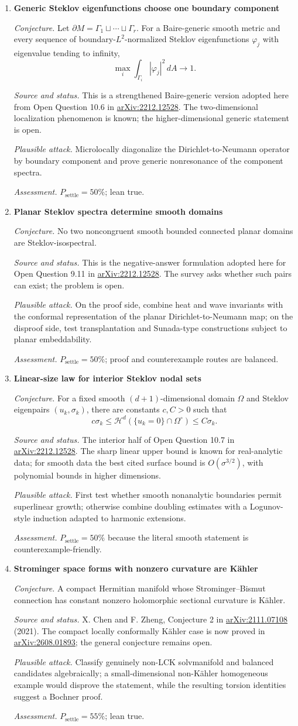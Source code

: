 \documentclass[11pt]{article}
\newcommand{\cand}[5]{%
  \item \textbf{#1}\par
  \emph{Conjecture.} #2\par
  \emph{Source and status.} #3\par
  \emph{Plausible attack.} #4\par
  \emph{Assessment.} #5
}
\newcommand{\psettle}{P_{\mathrm{settle}}}
\begin{document}
\begin{enumerate}[label=\textbf{M\arabic*.}]
\cand{Generic Steklov eigenfunctions choose one boundary component}
{Let $\partial M=\Gamma_1\sqcup\cdots\sqcup\Gamma_r$.  For a Baire-generic smooth metric and every sequence of boundary-$L^2$-normalized Steklov eigenfunctions $\varphi_j$ with eigenvalue tending to infinity,
\[\max_i\int_{\Gamma_i}|\varphi_j|^2\,dA\longrightarrow1.\]}
{This is a strengthened Baire-generic version adopted here from Open Question 10.6 in \href{https://arxiv.org/abs/2212.12528}{arXiv:2212.12528}.  The two-dimensional localization phenomenon is known; the higher-dimensional generic statement is open.}
{Microlocally diagonalize the Dirichlet-to-Neumann operator by boundary component and prove generic nonresonance of the component spectra.}
{$\psettle=50\%$; lean true.}

\cand{Planar Steklov spectra determine smooth domains}
{No two noncongruent smooth bounded connected planar domains are Steklov-isospectral.}
{This is the negative-answer formulation adopted here for Open Question 9.11 in \href{https://arxiv.org/abs/2212.12528}{arXiv:2212.12528}.  The survey asks whether such pairs can exist; the problem is open.}
{On the proof side, combine heat and wave invariants with the conformal representation of the planar Dirichlet-to-Neumann map; on the disproof side, test transplantation and Sunada-type constructions subject to planar embeddability.}
{$\psettle=50\%$; proof and counterexample routes are balanced.}

\cand{Linear-size law for interior Steklov nodal sets}
{For a fixed smooth $(d+1)$-dimensional domain $\Omega$ and Steklov eigenpairs $(u_k,\sigma_k)$, there are constants $c,C>0$ such that
\[c\sigma_k\le\mathcal H^d(\{u_k=0\}\cap\Omega^\circ)\le C\sigma_k.\]}
{The interior half of Open Question 10.7 in \href{https://arxiv.org/abs/2212.12528}{arXiv:2212.12528}.  The sharp linear upper bound is known for real-analytic data; for smooth data the best cited surface bound is $O(\sigma^{3/2})$, with polynomial bounds in higher dimensions.}
{First test whether smooth nonanalytic boundaries permit superlinear growth; otherwise combine doubling estimates with a Logunov-style induction adapted to harmonic extensions.}
{$\psettle=50\%$ because the literal smooth statement is counterexample-friendly.}

\cand{Strominger space forms with nonzero curvature are K\"ahler}
{A compact Hermitian manifold whose Strominger--Bismut connection has constant nonzero holomorphic sectional curvature is K\"ahler.}
{X. Chen and F. Zheng, Conjecture 2 in \href{https://arxiv.org/abs/2111.07108}{arXiv:2111.07108} (2021).  The compact locally conformally K\"ahler case is now proved in \href{https://arxiv.org/abs/2608.01893}{arXiv:2608.01893}; the general conjecture remains open.}
{Classify genuinely non-LCK solvmanifold and balanced candidates algebraically; a small-dimensional non-K\"ahler homogeneous example would disprove the statement, while the resulting torsion identities suggest a Bochner proof.}
{$\psettle=55\%$; lean true.}


\end{enumerate}
\end{document}
